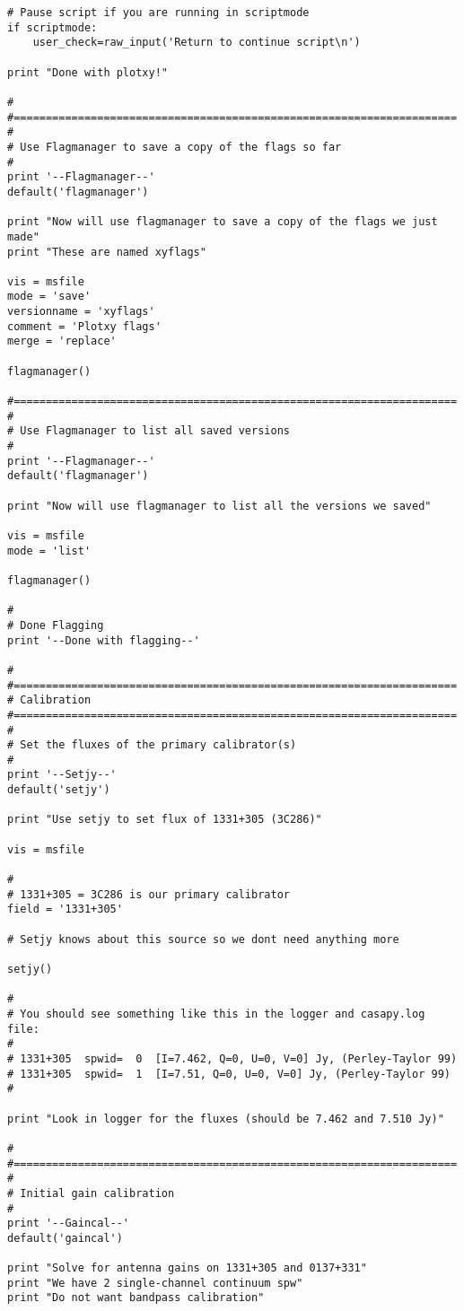 \begin{verbatim}
# Pause script if you are running in scriptmode
if scriptmode:
    user_check=raw_input('Return to continue script\n')

print "Done with plotxy!"

#
#=====================================================================
#
# Use Flagmanager to save a copy of the flags so far
#
print '--Flagmanager--'
default('flagmanager')

print "Now will use flagmanager to save a copy of the flags we just made"
print "These are named xyflags"

vis = msfile
mode = 'save'
versionname = 'xyflags'
comment = 'Plotxy flags'
merge = 'replace'

flagmanager()

#=====================================================================
#
# Use Flagmanager to list all saved versions
#
print '--Flagmanager--'
default('flagmanager')

print "Now will use flagmanager to list all the versions we saved"

vis = msfile
mode = 'list'

flagmanager()

#
# Done Flagging
print '--Done with flagging--'

#
#=====================================================================
# Calibration
#=====================================================================
#
# Set the fluxes of the primary calibrator(s)
#
print '--Setjy--'
default('setjy')

print "Use setjy to set flux of 1331+305 (3C286)"

vis = msfile

#
# 1331+305 = 3C286 is our primary calibrator
field = '1331+305'     

# Setjy knows about this source so we dont need anything more

setjy()

#
# You should see something like this in the logger and casapy.log file:
#
# 1331+305  spwid=  0  [I=7.462, Q=0, U=0, V=0] Jy, (Perley-Taylor 99)
# 1331+305  spwid=  1  [I=7.51, Q=0, U=0, V=0] Jy, (Perley-Taylor 99)
# 

print "Look in logger for the fluxes (should be 7.462 and 7.510 Jy)"

#
#=====================================================================
#
# Initial gain calibration
#
print '--Gaincal--'
default('gaincal')

print "Solve for antenna gains on 1331+305 and 0137+331"
print "We have 2 single-channel continuum spw"
print "Do not want bandpass calibration"


\end{verbatim}
